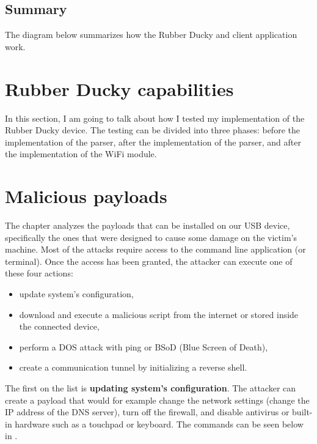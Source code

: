 \section{Summary}
The diagram below  summarizes how the Rubber Ducky and client application work.

\chapter{Rubber Ducky capabilities}
\label{practicalTest}
In this section, I am going to talk about how I tested my implementation of the Rubber Ducky device. The testing can be divided into three phases: before the implementation of the parser, after the implementation of the parser, and after the implementation of the WiFi module.


\chapter{Malicious payloads}
\label{maliciousPayloads}
The chapter analyzes the payloads that can be installed on our USB device, specifically the ones that were designed to cause some damage on the victim's machine. Most of the attacks require access to the command line application (or terminal). Once the access has been granted, the attacker can execute one of these four actions:

\begin{itemize}
    \item update system's configuration,
    \item download and execute a malicious script from the internet or stored inside the connected device,
    \item perform a DOS attack with ping or BSoD (Blue Screen of Death),
    \item create a communication tunnel by initializing a reverse shell.
\end{itemize}

The first on the list is \textbf{updating system's configuration}. The attacker can create a payload that would for example change the network settings (change the IP address of the DNS server), turn off the firewall, and disable antivirus or built-in hardware such as a touchpad or keyboard. The commands can be seen below in .


